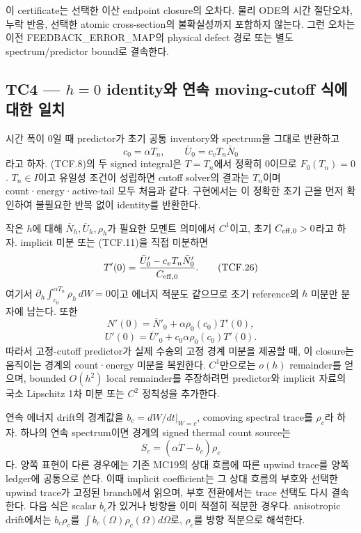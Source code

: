 \documentclass[11pt,a4paper]{article}
\begin{document}
이 certificate는 선택한 이산 endpoint closure의 오차다. 물리 ODE의 시간 절단오차, 누락 반응, 선택한 atomic cross-section의 불확실성까지 포함하지 않는다. 그런 오차는 이전 FEEDBACK\_ERROR\_MAP의 physical defect 경로 또는 별도 spectrum/predictor bound로 결속한다.

\hypertarget{tc4-h0-identityuxc640-uxc5f0uxc18d-moving-cutoff-uxc2dduxc5d0-uxb300uxd55c-uxc77cuxce58}{%
\subsection{\texorpdfstring{TC4 --- \(h=0\) identity와 연속 moving-cutoff 식에 대한 일치}{TC4 --- h=0 identity와 연속 moving-cutoff 식에 대한 일치}}\label{tc4-h0-identityuxc640-uxc5f0uxc18d-moving-cutoff-uxc2dduxc5d0-uxb300uxd55c-uxc77cuxce58}}

시간 폭이 0일 때 predictor가 초기 공통 inventory와 spectrum을 그대로 반환하고 \[
c_0=\alpha T_n,\qquad
\bar U_0=c_vT_n\bar N_0
\tag{TCF.25}
\] 라고 하자. (TCF.8)의 두 signed integral은 \(T=T_n\)에서 정확히 0이므로 \(F_0(T_n)=0\). \(T_n\in I\)이고 유일성 조건이 성립하면 cutoff solver의 결과는 \(T_n\)이며 count·energy·active-tail 모두 처음과 같다. 구현에서는 이 정확한 초기 근을 먼저 확인하여 불필요한 반복 없이 identity를 반환한다.

작은 \(h\)에 대해 \(\bar N_h,\bar U_h,\rho_h\)가 필요한 모멘트 의미에서 \(C^1\)이고, 초기 \(C_{\rm eff,0}>0\)라고 하자. implicit 미분 또는 (TCF.11)을 직접 미분하면 \[
T'(0)=
\frac{\bar U'_0-c_vT_n\bar N'_0}{C_{\rm eff,0}} .
\tag{TCF.26}
\] 여기서 \(\partial_h\int_{c_0}^{\alpha T_n}\rho_h\,dW=0\)이고 에너지 적분도 같으므로 초기 reference의 \(h\) 미분만 분자에 남는다. 또한 \[
N'(0)=\bar N'_0+\alpha\rho_0(c_0)T'(0),
\] \[
U'(0)=\bar U'_0+c_0\alpha\rho_0(c_0)T'(0).
\tag{TCF.27}
\] 따라서 고정-cutoff predictor가 실제 수송의 고정 경계 미분을 제공할 때, 이 closure는 움직이는 경계의 count·energy 미분을 복원한다. \(C^1\)만으로는 \(o(h)\) remainder를 얻으며, bounded \(O(h^2)\) local remainder를 주장하려면 predictor와 implicit 자료의 국소 Lipschitz 1차 미분 또는 \(C^2\) 정칙성을 추가한다.

연속 에너지 drift의 경계값을 \(b_c=dW/dt|_{W=c}\), comoving spectral trace를 \(\rho_c\)라 하자. 하나의 연속 spectrum이면 경계의 signed thermal count source는 \[
S_c=(\alpha\dot T-b_c)\rho_c
\tag{TCF.28}
\] 다. 양쪽 표현이 다른 경우에는 기존 MC19의 상대 흐름에 따른 upwind trace를 양쪽 ledger에 공통으로 쓴다. 이때 implicit coefficient는 그 상대 흐름의 부호와 선택한 upwind trace가 고정된 branch에서 읽으며, 부호 전환에서는 trace 선택도 다시 결속한다. 다음 식은 scalar \(b_c\)가 있거나 방향을 이미 적절히 적분한 경우다. anisotropic drift에서는 \(b_c\rho_c\)를 \(\int b_c(\Omega)\rho_c(\Omega)d\Omega\)로, \(\rho_c\)를 방향 적분으로 해석한다.
\end{document}
